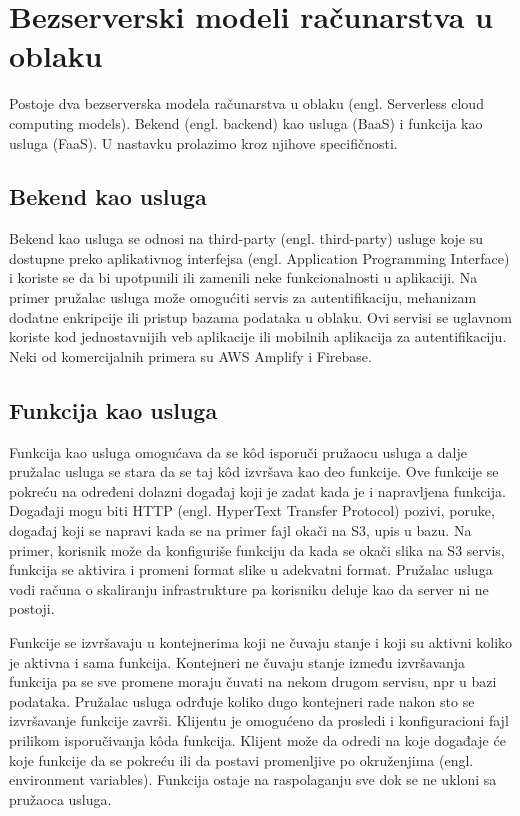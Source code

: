 \documentclass[12pt,oneside]{memoir}
\begin{document}
\section{Bezserverski modeli računarstva u oblaku}
Postoje dva bezserverska modela računarstva u oblaku (engl. Serverless cloud computing models). Bekend (engl. backend) kao usluga (BaaS) i funkcija kao usluga (FaaS). U nastavku prolazimo kroz njihove specifičnosti.

\subsection{Bekend kao usluga}

Bekend kao usluga se odnosi na third-party (engl. third-party) usluge koje su dostupne preko aplikativnog interfejsa (engl. Application Programming Interface) i koriste se da bi upotpunili ili zamenili neke funkcionalnosti u aplikaciji. Na primer pružalac usluga može omogućiti servis za autentifikaciju, mehanizam dodatne enkripcije ili pristup bazama podataka u oblaku. Ovi servisi se uglavnom koriste kod jednostavnijih veb aplikacije ili mobilnih aplikacija za autentifikaciju\cite{wis}\cite{bsa}. Neki od komercijalnih primera su AWS Amplify i Firebase\cite{baasp}.

\subsection{Funkcija kao usluga}
Funkcija kao usluga omogućava da se kôd isporuči pružaocu usluga a dalje pružalac usluga se stara da se taj kôd izvršava kao deo funkcije. Ove funkcije se pokreću na određeni dolazni događaj koji je zadat kada je i napravljena funkcija. Događaji mogu biti HTTP (engl. HyperText Transfer Protocol) pozivi, poruke, događaj koji se napravi kada se na primer fajl okači na S3, upis u bazu. Na primer, korisnik može da konfiguriše funkciju da kada se okači slika na S3 servis, funkcija se aktivira i promeni format slike u adekvatni format. Pružalac usluga vodi računa o skaliranju infrastrukture pa korisniku deluje kao da server ni ne postoji. 

Funkcije se izvršavaju u kontejnerima koji ne čuvaju stanje i koji su aktivni koliko je aktivna i sama funkcija. Kontejneri ne čuvaju stanje između izvršavanja funkcija pa se sve promene moraju čuvati na nekom drugom servisu, npr u bazi podataka. Pružalac usluga odrđuje koliko dugo kontejneri rade nakon sto se izvršavanje funkcije završi. Klijentu je omogućeno da prosledi i konfiguracioni fajl prilikom isporučivanja kôda funkcija. Klijent može da odredi na koje događaje će koje funkcije da se pokreću ili da postavi promenljive po okruženjima (engl. environment variables). Funkcija ostaje na raspolaganju sve dok se ne ukloni sa pružaoca usluga\cite{bsa}.
\end{document}
